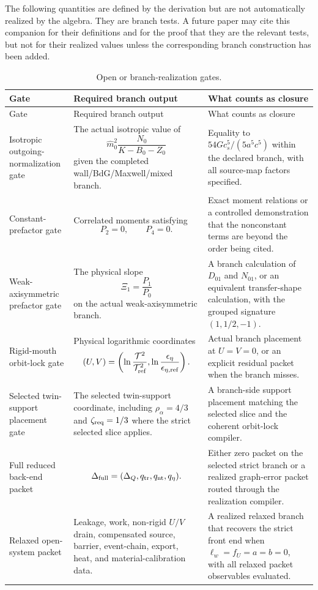 The following quantities are defined by the derivation but are not automatically realized by the algebra.  They are branch tests.  A future paper may cite this companion for their definitions and for the proof that they are the relevant tests, but not for their realized values unless the corresponding branch construction has been added.

\begin{longtable}{@{}L{0.23\textwidth}L{0.34\textwidth}L{0.31\textwidth}@{}}
\caption{Open or branch-realization gates.}\label{tab:open-branch-realization-gates}\\
\toprule
Gate & Required branch output & What counts as closure \\
\midrule
\endfirsthead
\toprule
Gate & Required branch output & What counts as closure \\
\midrule
\endhead
Isotropic outgoing-normalization gate & The actual isotropic value of
\[
 \widehat m_0^2\frac{N_0}{K-B_0-Z_0}
\]
given the completed wall/BdG/Maxwell/mixed branch. & Equality to \(54Gc_s^5/(5a^5c^5)\) within the declared branch, with all source-map factors specified. \\
\addlinespace
Constant-prefactor gate & Correlated moments satisfying
\[
P_2=0,
\qquad
P_4=0.
\]
 & Exact moment relations or a controlled demonstration that the nonconstant terms are beyond the order being cited. \\
\addlinespace
Weak-axisymmetric prefactor gate & The physical slope
\[
\Xi_1=\frac{P_1}{P_0}
\]
 on the actual weak-axisymmetric branch. & A branch calculation of \(D_{01}\) and \(N_{01}\), or an equivalent transfer-shape calculation, with the grouped signature \((1,1/2,-1)\). \\
\addlinespace
Rigid-mouth orbit-lock gate & Physical logarithmic coordinates
\[
(U,V)=\left(\ln\frac{\mathcal T^2}{\mathcal T_{\rm ref}^2},\ln\frac{\epsilon_\eta}{\epsilon_{\eta,{\rm ref}}}\right).
\]
 & Actual branch placement at \(U=V=0\), or an explicit residual packet when the branch misses. \\
\addlinespace
Selected twin-support placement gate & The selected twin-support coordinate, including \(\rho_\alpha=4/3\) and \(\zeta_{\rm req}=1/3\) where the strict selected slice applies. & A branch-side support placement matching the selected slice and the coherent orbit-lock compiler. \\
\addlinespace
Full reduced back-end packet &
\[
\Delta_{\rm full}=(\Delta_Q,q_{\rm tr},q_{\rm nt},q_\eta).
\]
 & Either zero packet on the selected strict branch or a realized graph-error packet routed through the realization compiler. \\
\addlinespace
Relaxed open-system packet & Leakage, work, non-rigid \(U/V\) drain, compensated source, barrier, event-chain, export, heat, and material-calibration data. & A realized relaxed branch that recovers the strict front end when \(\ell_w=f_U=a=b=0\), with all relaxed packet observables evaluated. \\
\bottomrule
\end{longtable}

